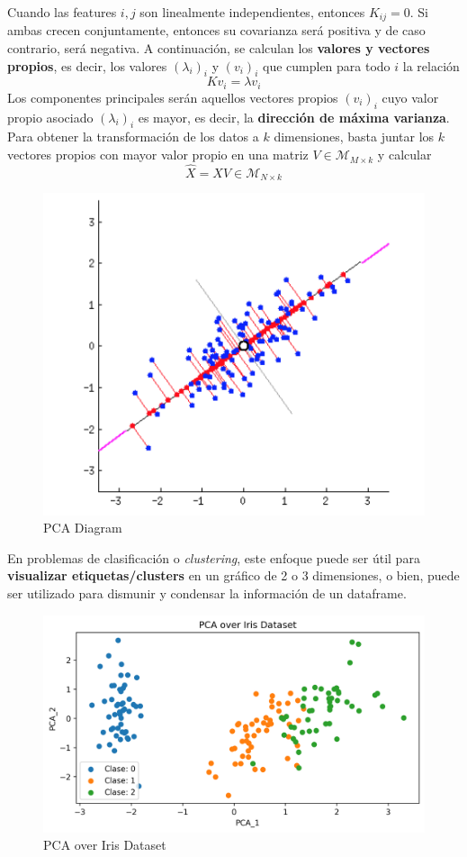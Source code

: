 Cuando las features $i,j$ son linealmente independientes, entonces $K_{ij} = 0$. Si ambas crecen conjuntamente, entonces su covarianza será positiva y de caso contrario, será negativa. A continuación, se calculan los \textbf{valores y vectores propios}, es decir, los valores $(\lambda_i)_i$ y $(v_i)_i$ que cumplen para todo $i$ la relación 
$$
K v_i = \lambda v_i 
$$
Los componentes principales serán aquellos vectores propios $(v_i)_i$ cuyo valor propio asociado $(\lambda_i)_i$ es mayor, es decir, la \textbf{dirección de máxima varianza}. Para obtener la transformación de los datos a $k$ dimensiones, basta juntar los $k$ vectores propios con mayor valor propio en una matriz $V \in \mathcal{M}_{M \times k}$ y calcular 
$$ 
\hat{X} = XV \in \mathcal{M}_{N \times k}
$$
\begin{figure}[H]
    \center
    \includegraphics[scale=0.9]{notebooks/ML/img/pca_diagram.png}
    \caption{PCA Diagram}
\end{figure}
En problemas de clasificación o \textit{clustering}, este enfoque puede ser útil para \textbf{visualizar etiquetas/clusters} en un gráfico de 2 o 3 dimensiones, o bien, puede ser utilizado para dismunir y condensar la información de un dataframe. 
\begin{figure}[H]
    \center
    \includegraphics[scale=0.6]{notebooks/ML/img/pca_over_iris.png}
    \caption{PCA over Iris Dataset}
\end{figure}






